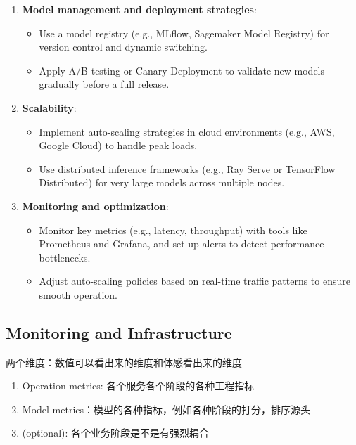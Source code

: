 \documentclass[12pt]{article}
\numberwithin{theorem}{section} %
\numberwithin{definition}{section} %
\numberwithin{assumption}{section} %
\numberwithin{lemma}{section} %
\numberwithin{remark}{section} %
\numberwithin{prop}{section} %
\numberwithin{corollary}{section} %
\numberwithin{example}{section} %
\numberwithin{question}{section} %
\numberwithin{problem}{section} %
\numberwithin{conjecture}{section} %
\numberwithin{append}{section} %
\numberwithin{property}{section} %
\begin{document}
\begin{CJK}{UTF8}{gbsn}
\begin{itemize}
\begin{enumerate}
			\item \textbf{Model management and deployment strategies}:
			\begin{itemize}
				\item Use a model registry (e.g., MLflow, Sagemaker Model Registry) for version control and dynamic switching.
				\item Apply A/B testing or Canary Deployment to validate new models gradually before a full release.
			\end{itemize}
			
			\item \textbf{Scalability}:
			\begin{itemize}
				\item Implement auto-scaling strategies in cloud environments (e.g., AWS, Google Cloud) to handle peak loads.
				\item Use distributed inference frameworks (e.g., Ray Serve or TensorFlow Distributed) for very large models across multiple nodes.
			\end{itemize}
			
			\item \textbf{Monitoring and optimization}:
			\begin{itemize}
				\item Monitor key metrics (e.g., latency, throughput) with tools like Prometheus and Grafana, and set up alerts to detect performance bottlenecks.
				\item Adjust auto-scaling policies based on real-time traffic patterns to ensure smooth operation.
			\end{itemize}
		\end{enumerate}
		\end{itemize}


	
	\subsection{Monitoring and Infrastructure}
	
	两个维度：数值可以看出来的维度和体感看出来的维度
	\begin{enumerate}
		\item Operation metrics: 各个服务各个阶段的各种工程指标
		\item Model metrics：模型的各种指标，例如各种阶段的打分，排序源头
		\item (optional): 各个业务阶段是不是有强烈耦合
	\end{enumerate}
	

\end{CJK}
\end{document}

